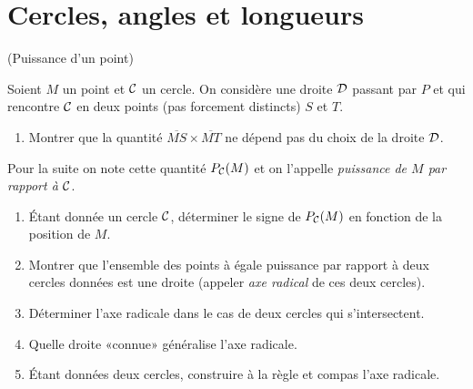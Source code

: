 \documentclass[a4paper,11pt,reqno]{amsart}
\begin{document}
\section{Cercles, angles et longueurs}

\begin{exo} (Puissance d'un point)

  Soient $M$ un point et $\mathcal{C}$ un cercle. On considère une droite $\mathcal{D}$ passant par $P$ et qui rencontre $\mathcal{C}$ en deux points (pas forcement distincts) $S$ et $T$.
  \begin{enumerate}
    \item Montrer que la quantité $\overline{MS}\times \overline{MT}$ ne dépend pas du choix de la droite $\mathcal{D}$.
  \end{enumerate}
  \begin{convention}
    Pour la suite on note cette quantité $P_{\mathcal{C}}(M)$ et on l'appelle \emph{puissance de $M$ par rapport à $\mathcal{C}$}.
  \end{convention}
  \begin{enumerate}[resume]
    \item Étant donnée un cercle $\mathcal{C}$, déterminer le signe de $P_{\mathcal{C}}(M)$ en fonction de la position de $M$.
    \item Montrer que l'ensemble des points à égale puissance par rapport à deux cercles données est une droite (appeler \emph{axe radical} de ces deux cercles).
    \item Déterminer l'axe radicale dans le cas de deux cercles qui s'intersectent.
    \item Quelle droite «connue» généralise l'axe radicale.
    \item Étant données deux cercles, construire à la règle et compas l'axe radicale.
  \end{enumerate}
\end{exo}
\end{document}
